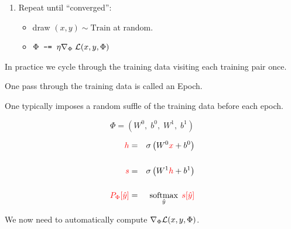{\begin{enumerate}
  \vfill
  \item Repeat until ``converged'':

    \vfill
    \begin{itemize}
    \item draw $(x,y) \sim \mathrm{Train}$ at random.
      \vfill
    \item $\Phi \;\;\mbox{\tt -=}\;\; \eta \nabla_\Phi\;{\cal L}(x,y,\Phi)$
    \end{itemize}
\end{enumerate}


In practice we cycle through the training data visiting each training pair once.

\vfill
One pass through the training data is called an Epoch.

\vfill
One typically imposes a random suffle of the training data before each epoch.


$$\Phi = (W^0,\;b^0,\;W^1,\;b^1)$$

\begin{eqnarray*}
  {\color{red} h} & = & \sigma\left(W^0{\color{red} x} + b^0\right) \\
  \\
  {\color{red} s} & = & \sigma\left(W^1{\color{red} h} + b^1 \right) \\
  \\
  {\color{red} P_\Phi[\hat{y}]} & = & \operatorname*{softmax}_{\hat{y}}\;{\color{red} s[\hat{y}]}
\end{eqnarray*}

\vfill
We now need to automatically compute $\nabla_\Phi {\cal L}(x,y,\Phi)$.



}
